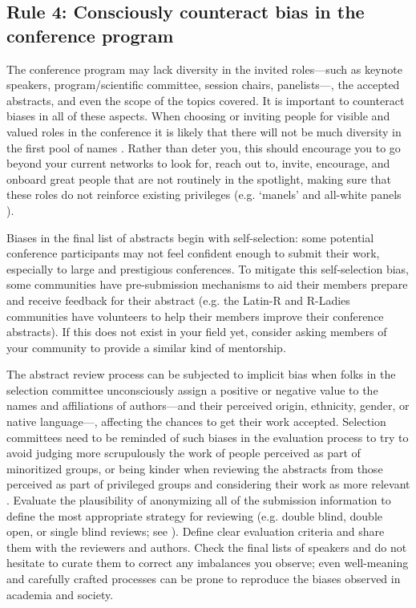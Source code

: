 \documentclass[10pt,letterpaper]{article}
\begin{document}
\subsection*{Rule 4: Consciously counteract bias in the conference program}
\label{rule_unbias}

The conference program may lack diversity in the invited roles––such as keynote speakers, program/scientific committee, session chairs, panelists––, the accepted abstracts, and even the scope of the topics covered. 
It is important to counteract biases in all of these aspects.
When choosing or inviting people for visible and valued roles in the conference it is likely that there will not be much diversity in the first pool of names \cite{dwyerNoticeWhoScience2021,swartzScienceValueDiversity2019,wongBuildDiversityScience2020,dignazioUnicornsJanitorsNinjas2020}. 
Rather than deter you, this should encourage you to go beyond your current networks to look for, reach out to, invite, encourage, and onboard great people that are not routinely in the spotlight, making sure that these roles do not reinforce existing privileges (e.g. `manels' and all-white panels \cite{else_how_2019}).

Biases in the final list of abstracts begin with self-selection: some potential conference participants may not feel confident enough to submit their work, especially to large and prestigious conferences.
To mitigate this self-selection bias, 
some communities have pre-submission mechanisms to aid their members prepare and receive feedback for their abstract (e.g. the Latin-R and R-Ladies communities have volunteers to help their members improve their conference abstracts).
If this does not exist in your field yet, consider asking members of your community to provide a similar kind of mentorship.

The abstract review process can be subjected to implicit bias \cite{ross_everyday_2020} when folks in the selection committee unconsciously assign a positive or negative value to the names and affiliations of authors—and their perceived origin, ethnicity, gender, or native language—, affecting the chances to get their work accepted. 
Selection committees need to be reminded of such biases in the evaluation process to try to avoid judging more scrupulously the work of people perceived as part of minoritized groups, or being kinder when reviewing the abstracts from those perceived as part of privileged groups and considering their work as more relevant \cite{swartzScienceValueDiversity2019}.
Evaluate the plausibility of anonymizing all of the submission information to
define the most appropriate strategy for reviewing (e.g. double blind, double open, or single blind reviews; see \cite{numfocus_discover_2021}).
Define clear evaluation criteria and share them with the reviewers and authors.
Check the final lists of speakers and do not hesitate to curate them to correct any imbalances you observe; even well-meaning and carefully crafted processes can be prone to reproduce the biases observed in academia and society.
\end{document}

